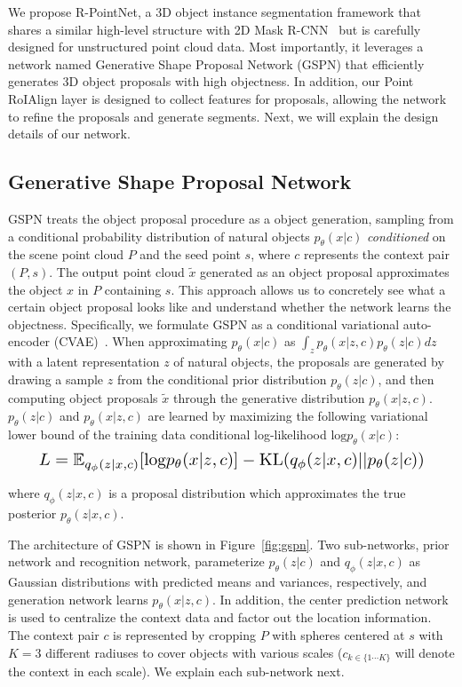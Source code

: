 \documentclass[10pt,twocolumn,letterpaper]{article}
\begin{document}
We propose R-PointNet, a 3D object instance segmentation framework that shares a similar high-level structure with 2D Mask R-CNN~\cite{he2017mask} but is carefully designed for unstructured point cloud data. Most importantly, it leverages a network named Generative Shape Proposal Network (GSPN) that efficiently generates 3D object proposals with high objectness. In addition, our Point RoIAlign layer is designed to collect features for proposals, allowing the network to refine the proposals and generate segments. Next, we will explain the design details of our network.



\subsection{Generative Shape Proposal Network}


GSPN treats the object proposal procedure as a object generation, sampling from a conditional probability distribution of natural objects $p_{\theta}(x|c)$ \emph{conditioned} on the scene point cloud $P$ and the seed point $s$, where $c$ represents the context pair $(P, s)$. The output point cloud $\tilde{x}$ generated as an object proposal approximates the object $x$ in $P$ containing $s$.
This approach allows us to concretely see what a certain object proposal looks like and understand whether the network learns the objectness.
Specifically, we formulate GSPN as a conditional variational auto-encoder (CVAE)~\cite{sohn2015learning}.
When approximating $p_{\theta}(x|c)$ as $\int_z p_{\theta}(x|z, c)p_{\theta}(z|c)dz$ with a latent representation $z$ of natural objects, the proposals are generated by drawing a sample $z$ from the conditional prior distribution $p_{\theta}(z|c)$, and then computing object proposals $\tilde{x}$ through the generative distribution $p_{\theta}(x|z, c)$. $p_{\theta}(z|c)$ and $p_{\theta}(x|z, c)$ are learned by maximizing the following
variational lower bound of the training data conditional log-likelihood $\text{log} p_{\theta}(x|c)$:
\begin{equation}
\resizebox{.9\hsize}{!}{$
L = \mathbb{E}_{q_{\phi}(z|x,c)}[\text{log}p_{\theta}(x|z, c)]-\text{KL}(q_{\phi}(z|x, c)||p_{\theta}(z|c))$}
\end{equation}

\noindent
where $q_{\phi}(z|x,c)$ is a proposal distribution which approximates the true posterior $p_{\theta}(z|x,c)$.

The architecture of GSPN is shown in Figure~\ref{fig:gspn}.
Two sub-networks, prior network and recognition network, parameterize $p_{\theta}(z|c)$ and $q_{\phi}(z|x,c)$ as Gaussian distributions with predicted means and variances, respectively, and generation network learns $p_{\theta}(x|z, c)$. In addition, the center prediction network is used to centralize the context data and factor out the location information.
The context pair $c$ is represented by cropping $P$ with spheres centered at $s$ with $K=3$ different radiuses to cover objects with various scales ($c_{k \in \{1 \cdots K\}}$ will denote the context in each scale).
We explain each sub-network next.
\end{document}
